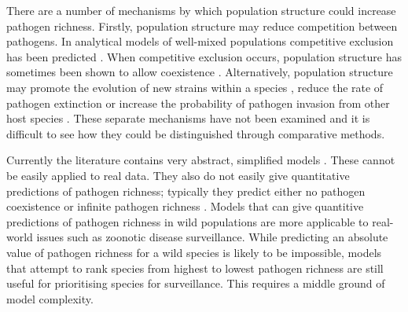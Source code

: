 There are a number of mechanisms by which population structure could increase pathogen richness.
Firstly, population structure may reduce competition between pathogens.
In analytical models of well-mixed populations competitive exclusion has been predicted \cite{ackleh2003competitive, bremermann1989competitive, martcheva2013competitive, qiu2013vector, allen2004sis}.
When competitive exclusion occurs, population structure has sometimes been shown to allow coexistence \cite{qiu2013vector, allen2004sis, nunes2006localized, garmer2016multistrain}.
Alternatively, population structure may promote the evolution of new strains within a species \cite{buckee2004effects}, reduce the rate of pathogen extinction \cite{rand1995invasion} or increase the probability of pathogen invasion from other host species \cite{nunes2006localized}.
These separate mechanisms have not been examined and it is difficult to see how they could be distinguished through comparative methods.




Currently the literature contains very abstract, simplified models \cite{qiu2013vector, allen2004sis, nunes2006localized, garmer2016multistrain}.
These cannot be easily applied to real data.
They also do not easily give quantitative predictions of pathogen richness; typically they predict either no pathogen coexistence \cite{bremermann1989competitive, martcheva2013competitive} or infinite pathogen richness \cite{may1994superinfection}.
Models that can give quantitive predictions of pathogen richness in wild populations are more applicable to real-world issues such as zoonotic disease surveillance.
While predicting an absolute value of pathogen richness for a wild species is likely to be impossible, models that attempt to rank species from highest to lowest pathogen richness are still useful for prioritising species for surveillance.
This requires a middle ground of model complexity.


